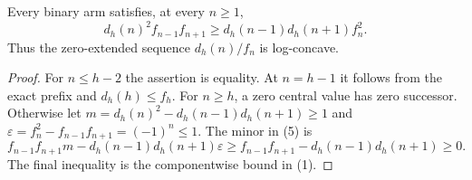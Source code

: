 \begin{theorem}
Every binary arm satisfies, at every $n\ge1$,
\[
 d_h(n)^2 f_{n-1}f_{n+1}
       \ge d_h(n-1)d_h(n+1) f_n^2.                       \tag{5}
\]
Thus the zero-extended sequence $d_h(n)/f_n$ is log-concave.
\end{theorem}
\begin{proof}
For $n\le h-2$ the assertion is equality.  At $n=h-1$ it
follows from the exact prefix and $d_h(h)\le f_h$.
For $n\ge h$, a zero central value has zero successor.  Otherwise
let $m=d_h(n)^2-d_h(n-1)d_h(n+1)\ge1$ and
$\varepsilon=f_n^2-f_{n-1}f_{n+1}=(-1)^n\le1$.
The minor in (5) is
\[
 f_{n-1}f_{n+1}m-d_h(n-1)d_h(n+1)\varepsilon
 \ge f_{n-1}f_{n+1}-d_h(n-1)d_h(n+1)\ge0.
\]
The final inequality is the componentwise bound in (1).
\end{proof}

